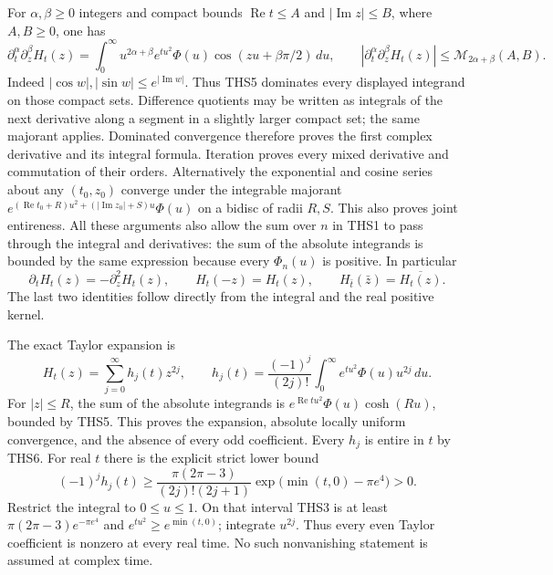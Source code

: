For $\alpha,\beta\ge0$ integers and compact bounds
$\operatorname{Re}t\le A$ and $|\operatorname{Im}z|\le B$,
where $A,B\ge0$, one has
\begin{equation}\tag{THS6}
 \partial_t^\alpha\partial_z^\beta H_t(z)
  =\int_0^\infty u^{2\alpha+\beta}e^{tu^2}\Phi(u)
                      \cos(zu+\beta\pi/2)\,du,
 \qquad
 |\partial_t^\alpha\partial_z^\beta H_t(z)|
     \le\mathcal M_{2\alpha+\beta}(A,B).
\end{equation}
Indeed $|\cos w|,|\sin w|\le e^{|\operatorname{Im}w|}$.
Thus THS5 dominates every displayed integrand on those compact
sets. Difference quotients may be written as integrals of the
next derivative along a segment in a slightly larger compact
set; the same majorant applies. Dominated convergence therefore
proves the first complex derivative and its integral formula.
Iteration proves every mixed derivative and commutation of their
orders. Alternatively the exponential and cosine series about
any $(t_0,z_0)$ converge under the integrable majorant
$e^{(\operatorname{Re}t_0+R)u^2+(|\operatorname{Im}z_0|+S)u}
\Phi(u)$ on a bidisc of radii $R,S$. This also proves joint
entireness. All these arguments also allow the sum over $n$ in
THS1 to pass through the integral and derivatives: the sum of
the absolute integrands is bounded by the same expression
because every $\Phi_n(u)$ is positive. In particular
\begin{equation}\tag{THS7}
 \partial_tH_t(z)=-\partial_z^2H_t(z),\qquad
 H_t(-z)=H_t(z),\qquad
 H_{\bar t}(\bar z)=\overline{H_t(z)}.
\end{equation}
The last two identities follow directly from the integral and
the real positive kernel.

The exact Taylor expansion is
\begin{equation}\tag{THS8}
 H_t(z)=\sum_{j=0}^{\infty}h_j(t)z^{2j},\qquad
 h_j(t)=\frac{(-1)^j}{(2j)!}
          \int_0^\infty e^{tu^2}\Phi(u)u^{2j}\,du.
\end{equation}
For $|z|\le R$, the sum of the absolute integrands is
$e^{\operatorname{Re}t u^2}\Phi(u)\cosh(Ru)$, bounded by
THS5. This proves the expansion, absolute locally uniform
convergence, and the absence of every odd coefficient.
Every $h_j$ is entire in $t$ by THS6. For real $t$ there is the
explicit strict lower bound
\begin{equation}\tag{THS9}
 (-1)^jh_j(t)\ge
 \frac{\pi(2\pi-3)}{(2j)!(2j+1)}
          \exp\bigl(\min(t,0)-\pi e^4\bigr)>0.
\end{equation}
Restrict the integral to $0\le u\le1$. On that interval THS3
is at least $\pi(2\pi-3)e^{-\pi e^4}$ and
$e^{tu^2}\ge e^{\min(t,0)}$; integrate $u^{2j}$.
Thus every even Taylor coefficient is nonzero at every real
time. No such nonvanishing statement is assumed at complex time.

